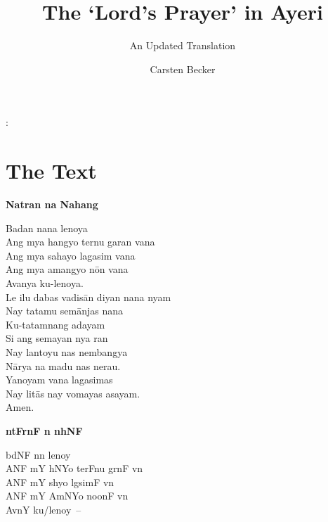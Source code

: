 \documentclass[12pt,paper=a4]{scrartcl}
\author{Carsten Becker}
\title{The ‘Lord's Prayer’ in Ayeri}
\subtitle{An Updated Translation}
\newenvironment{ayeri}{
    \Tagati
}{
}
\newenvironment{mytitle}{
    \hfill
    \begin{minipage}{0.667\textwidth}
	\vspace{\baselineskip}
	\begin{center}
	    \Large
	    \sffamily\bfseries
	    \makeatletter
}{
	    \makeatother
	\end{center}
	\vspace{1em}
    \end{minipage}
    \hfill
}
\begin{document}

\begin{mytitle}
    \@title: \@subtitle
\end{mytitle}

\section{The Text}
\begin{raggedright}
\begin{multicols}{2}
\textbf{Natran na Nahang} \\ [0.5\baselineskip]

\begin{linenumbers*}

Badan nana lenoya \\
Ang mya hangyo ternu garan vana \\
Ang mya sahayo lagasim vana \\
Ang mya amangyo nōn vana \\
Avanya ku-lenoya. \\ [0.5\baselineskip]

Le ilu dabas vadisān diyan nana nyam \\
Nay tatamu semānjas nana \\
Ku-tatamnang adayam \\
Si ang semayan nya ran \\
Nay lantoyu nas nembangya \\
Nārya na madu nas nerau. \\ [0.5\baselineskip]

Yanoyam vana lagasimas \\
Nay litās nay vomayas asayam. \\ [0.5\baselineskip]

Amen.

\end{linenumbers*}

\columnbreak

\begin{ayeri}
\textbf{ntFrnF n nhNF} \\ [0.5\baselineskip]

\begin{linenumbers*}

bdNF nn lenoy \\
ANF mY hNYo terFnu grnF vn \\
ANF mY shyo lgsimF vn \\
ANF mY AmNYo noonF vn \\
AvnY ku/lenoy~– \\ [0.5\baselineskip]


\end{linenumbers*}
\end{ayeri}
\end{multicols}
\end{raggedright}
\end{document}
